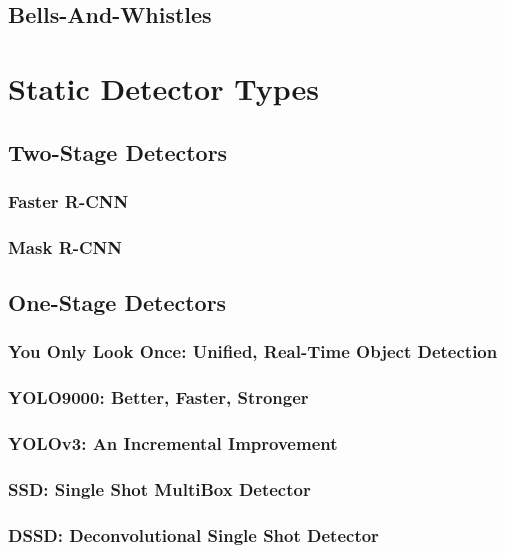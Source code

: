\documentclass[12pt, oneside]{article}
\begin{document}
\subsection{Bells-And-Whistles}

\section{Static Detector Types}

\vfill

\subsection{Two-Stage Detectors}

\subsubsection{Faster R-CNN}
\subsubsection{Mask R-CNN}

\subsection{One-Stage Detectors}

\subsubsection{You Only Look Once: Unified, Real-Time Object Detection}

\vfill

\subsubsection{YOLO9000: Better, Faster, Stronger}

\vfill

\subsubsection{YOLOv3: An Incremental Improvement}
\subsubsection{SSD: Single Shot MultiBox Detector}
\subsubsection{DSSD: Deconvolutional Single Shot Detector}
\end{document}
